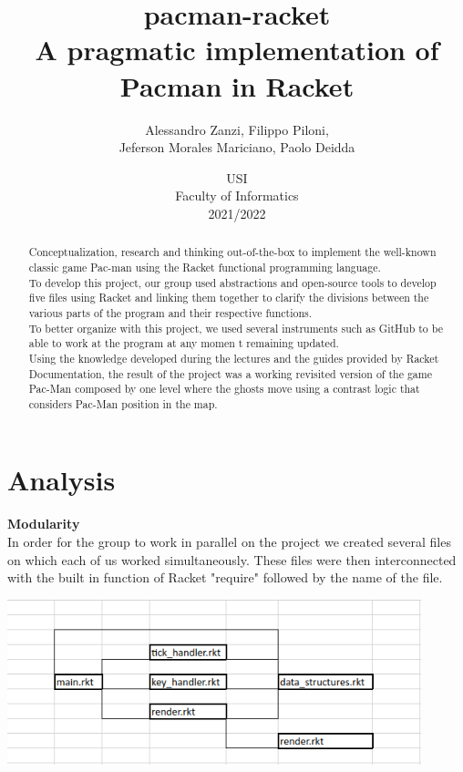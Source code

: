 \documentclass{article}
\title{
\textbf{pacman-racket} \\
A pragmatic implementation of Pacman in Racket
}
\author{
    Alessandro Zanzi,
    Filippo Piloni,\\
    Jeferson Morales Mariciano,
    Paolo Deidda
}
\date{
USI \\
Faculty of Informatics \\
[\baselineskip]  2021/2022
}
\begin{document}
\begin{titlepage}
\maketitle  

\end{titlepage}
 \begin{abstract}
Conceptualization, research and thinking out-of-the-box
to implement the well-known classic game Pac-man
using the Racket functional programming language.\\
To develop this project, our group used abstractions and open-source tools to develop five files using Racket and linking them together to clarify the divisions between the various parts of the program and their respective functions.\\
To better organize with this project, we used several instruments such as GitHub to be able to work at the program at any momen t remaining updated.\\
Using the knowledge developed during the lectures and the guides provided by Racket Documentation, the result of the project was a working revisited version of the game Pac-Man composed by one level where the ghosts move using a contrast logic that considers Pac-Man position in the map.

 \end{abstract}
\clearpage
 \tableofcontents
 \clearpage
 \section{Analysis}
 
 \hspace{0.5cm}\textbf{Modularity}\\
 In order for the group to work in parallel on the project we created several files on which each of us worked simultaneously. These files were then interconnected with the built in function of Racket "require" followed by the name of the file.

   \begin{center}
 \includegraphics[width=12cm]{images/dependency_tree.png}
 \end{center}
 
\end{document}
